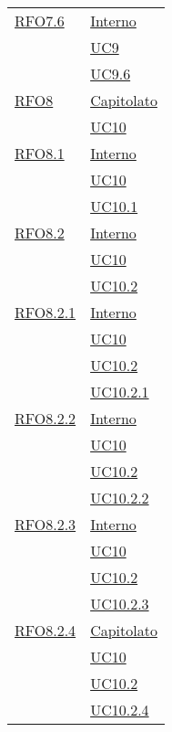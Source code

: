 \begin{longtable}{|>{\centering}m{5cm}|m{5cm}<{\centering}|}
   \hyperlink{RFO7.6}{RFO7.6} 
   & \hyperlink{Interno}{Interno}\\
   & \hyperref[UC9]{UC9}\\
   & \hyperref[UC9.6]{UC9.6}\\\hline
   
   \hyperlink{RFO8}{RFO8} 
   & \hyperlink{Capitolato}{Capitolato}\\
   & \hyperref[UC10]{UC10}\\\hline
   
      \hyperlink{RFO8.1}{RFO8.1} 
      & \hyperlink{Interno}{Interno}\\
   & \hyperref[UC10]{UC10}\\
      & \hyperref[UC10.1]{UC10.1}\\\hline
  
      \hyperlink{RFO8.2}{RFO8.2} 
      & \hyperlink{Interno}{Interno}\\
  & \hyperref[UC10]{UC10}\\
  & \hyperref[UC10.2]{UC10.2}\\\hline
  
      \hyperlink{RFO8.2.1}{RFO8.2.1} 
      & \hyperlink{Interno}{Interno}\\
  & \hyperref[UC10]{UC10}\\
  & \hyperref[UC10.2]{UC10.2}\\
   & \hyperref[UC10.2.1]{UC10.2.1}\\\hline
   
  \hyperlink{RFO8.2.2}{RFO8.2.2} 
  & \hyperlink{Interno}{Interno}\\
  & \hyperref[UC10]{UC10}\\
  & \hyperref[UC10.2]{UC10.2}\\
  & \hyperref[UC10.2.2]{UC10.2.2}\\\hline
  
  \hyperlink{RFO8.2.3}{RFO8.2.3} 
  & \hyperlink{Interno}{Interno}\\
  & \hyperref[UC10]{UC10}\\
  & \hyperref[UC10.2]{UC10.2}\\
  & \hyperref[UC10.2.3]{UC10.2.3}\\\hline
  
  \hyperlink{RFO8.2.4}{RFO8.2.4} 
  & \hyperlink{Capitolato}{Capitolato}\\
  & \hyperref[UC10]{UC10}\\
  & \hyperref[UC10.2]{UC10.2}\\
  & \hyperref[UC10.2.4]{UC10.2.4}\\\hline
  

\end{longtable}
